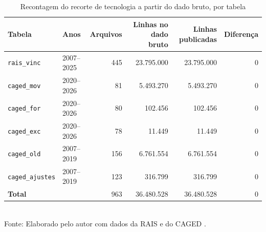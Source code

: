\begin{table}[htbp]
    \centering
    \caption{Recontagem do recorte de tecnologia a partir do dado bruto, por tabela}
    \label{tab:reprodutibilidade}
    \footnotesize
    \renewcommand{\arraystretch}{1.25}
    \begin{tabular}{llrrrr}
        \toprule
        \rowcolor{black!8}
        \textbf{Tabela} & \textbf{Anos} & \textbf{Arquivos} & \textbf{Linhas no dado bruto} & \textbf{Linhas publicadas} & \textbf{Diferença} \\
        \midrule
        \texttt{rais\_vinc} & 2007--2025 & 445 & 23.795.000 & 23.795.000 & 0 \\
        \texttt{caged\_mov} & 2020--2026 & 81 & 5.493.270 & 5.493.270 & 0 \\
        \texttt{caged\_for} & 2020--2026 & 80 & 102.456 & 102.456 & 0 \\
        \texttt{caged\_exc} & 2020--2026 & 78 & 11.449 & 11.449 & 0 \\
        \texttt{caged\_old} & 2007--2019 & 156 & 6.761.554 & 6.761.554 & 0 \\
        \texttt{caged\_ajustes} & 2007--2019 & 123 & 316.799 & 316.799 & 0 \\
        \textbf{Total} &  & 963 & 36.480.528 & 36.480.528 & 0 \\
        \bottomrule
    \end{tabular}
    \\[4pt]
    Fonte: Elaborado pelo autor com dados da RAIS e do CAGED \cite{RAIS2024, CAGED2024}.
\end{table}
